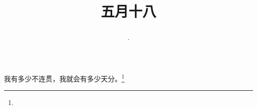 \title{\date[d=23,m=6,y=2024][year:cn-y,年,month:cn,day:cn,日,·,weekday]·五月十八 }
我有多少不连贯，我就会有多少天分。\footnote{ }

